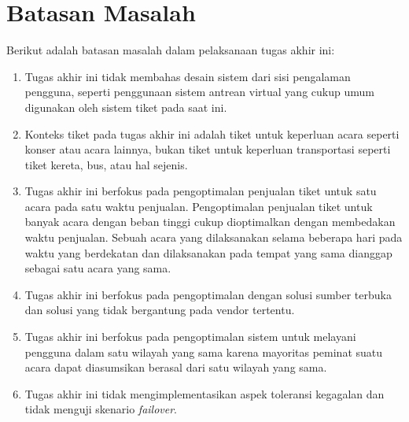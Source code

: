 \section{Batasan Masalah}
\label{sec:batasan-masalah}

Berikut adalah batasan masalah dalam pelaksanaan tugas akhir ini:

\begin{enumerate}
  \item Tugas akhir ini tidak membahas desain sistem dari sisi pengalaman pengguna, seperti penggunaan sistem antrean virtual yang cukup umum digunakan oleh sistem tiket pada saat ini.
  \item Konteks tiket pada tugas akhir ini adalah tiket untuk keperluan acara seperti konser atau acara lainnya, bukan tiket untuk keperluan transportasi seperti tiket kereta, bus, atau hal sejenis.
  \item Tugas akhir ini berfokus pada pengoptimalan penjualan tiket untuk satu acara pada satu waktu penjualan. Pengoptimalan penjualan tiket untuk banyak acara dengan beban tinggi cukup dioptimalkan dengan membedakan waktu penjualan. Sebuah acara yang dilaksanakan selama beberapa hari pada waktu yang berdekatan dan dilaksanakan pada tempat yang sama dianggap sebagai satu acara yang sama.
  \item Tugas akhir ini berfokus pada pengoptimalan dengan solusi sumber terbuka dan solusi yang tidak bergantung pada vendor tertentu.
  \item Tugas akhir ini berfokus pada pengoptimalan sistem untuk melayani pengguna dalam satu wilayah yang sama karena mayoritas peminat suatu acara dapat diasumsikan berasal dari satu wilayah yang sama.
  \item Tugas akhir ini tidak mengimplementasikan aspek toleransi kegagalan dan tidak menguji skenario \textit{failover}.
\end{enumerate}
